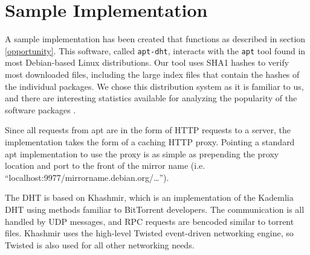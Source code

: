 \documentclass[conference]{IEEEtran}
\begin{document}
% 


\section{Sample Implementation}
\label{implementation}

A sample implementation has been created that functions as described
in section \ref{opportunity}. This software, called
\texttt{apt-dht}, interacts with the \texttt{apt} tool found in most
Debian-based Linux distributions. Our tool uses SHA1 hashes to
verify most downloaded files, including the large index files that
contain the hashes of the individual packages. We chose this
distribution system as it is familiar to us, and there are
interesting statistics available for analyzing the popularity of the
software packages \cite{popcon}.

Since all requests from apt are in the form of HTTP requests to a
server, the implementation takes the form of a caching HTTP proxy.
Pointing a standard apt implementation to use the proxy is as simple
as prepending the proxy location and port to the front of the mirror
name (i.e. ``localhost:9977/mirrorname.debian.org/\ldots'').

The DHT is based on Khashmir, which is an implementation of the
Kademlia DHT using methods familiar to BitTorrent developers. The
communication is all handled by UDP messages, and RPC requests are
bencoded similar to torrent files. Khashmir uses the high-level
Twisted event-driven networking engine, so Twisted is also used for
all other networking needs.
\end{document}
